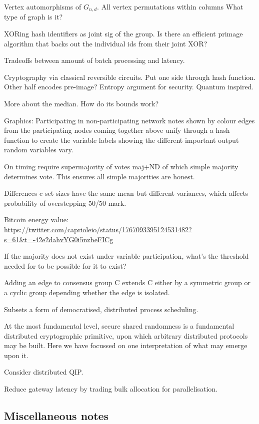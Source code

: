 Vertex automorphisms of $G_{n,d}$.
All vertex permutations within columns
What type of graph is it?

XORing hash identifiers as joint sig of the group. Is there an efficient primage algorithm that backs out the individual ids from their joint XOR?

Tradeoffs between amount of batch processing and latency.

Cryptography via classical reversible circuits. Put one side through hash function. Other half encodes pre-image? Entropy argument for security. Quantum inspired.

More about the median. How do its bounds work?

Graphics:
Participating in non-participating network notes shown by colour edges from the participating nodes coming together above unify through a hash function to create the variable labels showing the different important output random variables vary.

On timing require supermajority of votes maj+ND of which simple majority determines vote. This ensures all simple majorities are honest.

Differences c-set sizes have the same mean but different variances, which affects probability of overstepping 50/50 mark.

Bitcoin energy value: \url{https://twitter.com/caprioleio/status/1767093395124531482?s=61&t=-42e2dahvYG0i5nzbeFICg}

If the majority does not exist under variable participation, what's the threshold needed for to be possible for it to exist? 

Adding an edge to consensus group C extends C either by a symmetric group or a cyclic group depending whether the edge is isolated.

Subsets a form of democratised, distributed process scheduling.

At the most fundamental level, secure shared randomness is a fundamental distributed cryptographic primitive, upon which arbitrary distributed protocols may be built. Here we have focussed on one interpretation of what may emerge upon it.

Consider distributed QIP.

Reduce gateway latency by trading bulk allocation for parallelisation.

\subsection{Miscellaneous notes}

